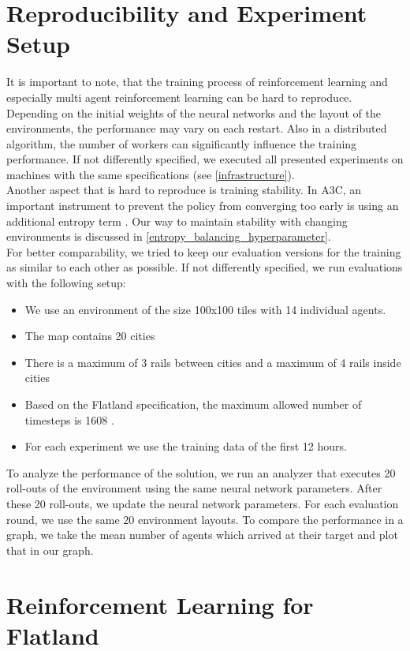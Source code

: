 \section[Reproducibility]{Reproducibility and Experiment Setup}\label{reproducability}
It is important to note, that the training process of reinforcement learning and especially multi agent reinforcement learning can be hard to reproduce. Depending on the initial weights of the neural networks and the layout of the environments, the performance may vary on each restart. Also in a distributed algorithm, the number of workers can significantly influence the training performance. If not differently specified, we executed all presented experiments on machines with the same specifications (see \autoref{infrastructure}).\\
Another aspect that is hard to reproduce is training stability. In A3C, an important instrument to prevent the policy from converging too early is using an additional entropy term \cite{a3c}. Our way to maintain stability with changing environments is discussed in \autoref{entropy_balancing_hyperparameter}.\\
For better comparability, we tried to keep our evaluation versions for the training as similar to each other as possible. If not differently specified, we run evaluations with the following setup:
\begin{itemize}
	\item We use an environment of the size 100x100 tiles with 14 individual agents.
	\item The map contains 20 cities
	\item There is a maximum of 3 rails between cities and a maximum of 4 rails inside cities
	\item Based on the Flatland specification, the maximum allowed number of timesteps is 1608 \cite{flatland_spec}.
	\item For each experiment we use the training data of the first 12 hours.
\end{itemize}
To analyze the performance of the solution, we run an analyzer that executes 20 roll-outs of the environment using the same neural network parameters. After these 20 roll-outs, we update the neural network parameters. For each evaluation round, we use the same 20 environment layouts.
To compare the performance in a graph, we take the mean number of agents which arrived at their target and plot that in our graph.
\section{Reinforcement Learning for Flatland}
\label{rl_flatland}
